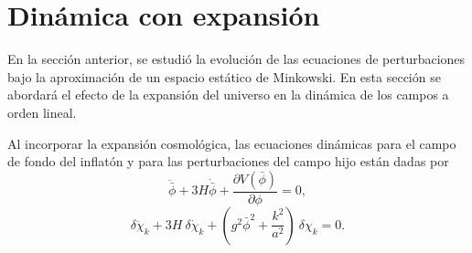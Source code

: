 \section{Dinámica con expansión}

En la sección anterior, se estudió la evolución de las ecuaciones de perturbaciones bajo la aproximación de un espacio estático de Minkowski. En esta sección se abordará el efecto de la expansión del universo en la dinámica de los campos a orden lineal.

Al incorporar la expansión cosmológica, las ecuaciones dinámicas para el campo de fondo del inflatón y para las perturbaciones del campo hijo están dadas por
\begin{equation}
    \ddot{\bar{\phi}} + 3 H \dot{\bar{\phi}} + \frac{\partial V \left( \bar{\phi} \right)}{\partial \phi} = 0,
\end{equation}
\begin{equation}
    \delta \ddot{\chi}_k + 3 H ~ \delta \dot{\chi}_k + \left( g^2 \bar{\phi}^2 + \frac{k^2}{a^2} \right) ~ \delta \chi_k = 0. 
\end{equation}

